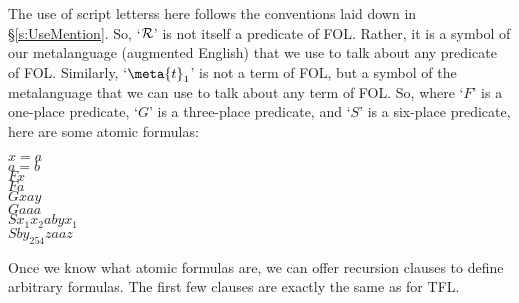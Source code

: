         
        
The use of script letterss here follows the conventions laid down in \S\ref{s:UseMention}. So, `$\mathcal{R}$' is not itself a predicate of FOL. Rather, it is a symbol of our metalanguage (augmented English) that we use to talk about any predicate of FOL. Similarly, `$\meta{t}_1$' is not a term of FOL, but a symbol of the metalanguage that we can use to talk about any term of FOL. So, where `$F$' is a one-place predicate, `$G$' is a three-place predicate, and `$S$' is a six-place predicate, here are some atomic formulas:
	\begin{center}
		$x = a$\\
		$a = b$\\
		$Fx$\\
		$Fa$\\
		$Gxay$\\
		$Gaaa$\\
		$Sx_1 x_2 a b y x_1$\\
		$Sby_{254} z a a z$
	\end{center}
Once we know what atomic formulas are, we can offer recursion clauses to define arbitrary formulas. The first few clauses are exactly the same as for TFL.
